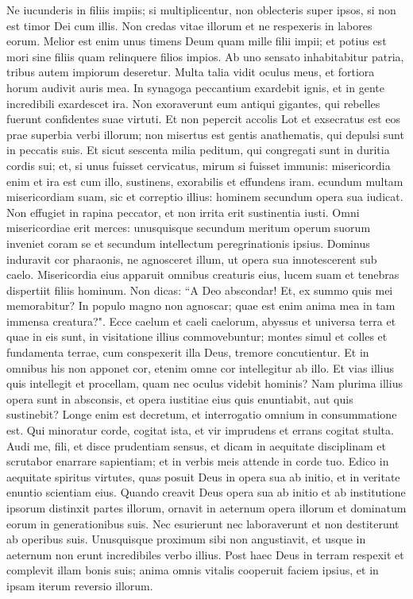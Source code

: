 \begin{biblechapter}  
\verse Ne iucunderis in filiis impiis; si multiplicentur, non oblecteris super ipsos, si non est timor Dei cum illis. 
\verse Non credas vitae illorum et ne respexeris in labores eorum. 
\verse Melior est enim unus timens Deum quam mille filii impii; 
\verse et potius est mori sine filiis quam relinquere filios impios. 
\verse Ab uno sensato inhabitabitur patria, tribus autem impiorum deseretur. 
\verse Multa talia vidit oculus meus, et fortiora horum audivit auris mea. 
\verse In synagoga peccantium exardebit ignis, et in gente incredibili exardescet ira. 
\verse Non exoraverunt eum antiqui gigantes, qui rebelles fuerunt confidentes suae virtuti. 
\verse Et non pepercit accolis Lot et exsecratus est eos prae superbia verbi illorum; 
\verse non misertus est gentis anathematis, qui depulsi sunt in peccatis suis. 
\verse Et sicut sescenta milia peditum, qui congregati sunt in duritia cordis sui; et, si unus fuisset cervicatus, mirum si fuisset immunis: 
\verse misericordia enim et ira est cum illo, sustinens, exorabilis et effundens iram. 
\verse ecundum multam misericordiam suam, sic et correptio illius: hominem secundum opera sua iudicat. 
\verse Non effugiet in rapina peccator, et non irrita erit sustinentia iusti. 
\verse Omni misericordiae erit merces: unusquisque secundum meritum operum suorum inveniet coram se et secundum intellectum peregrinationis ipsius. Dominus induravit cor pharaonis, ne agnosceret illum, ut opera sua innotescerent sub caelo. Misericordia eius apparuit omnibus creaturis eius, lucem suam et tenebras dispertiit filiis hominum. 
\verse Non dicas: “A Deo abscondar! Et, ex summo quis mei memorabitur? 
\verse In populo magno non agnoscar; quae est enim anima mea in tam immensa creatura?". 
\verse Ecce caelum et caeli caelorum, abyssus et universa terra et quae in eis sunt, in visitatione illius commovebuntur; 
\verse montes simul et colles et fundamenta terrae, cum conspexerit illa Deus, tremore concutientur. 
\verse Et in omnibus his non apponet cor, etenim omne cor intellegitur ab illo. 
\verse Et vias illius quis intellegit et procellam, quam nec oculus videbit hominis? 
\verse Nam plurima illius opera sunt in absconsis, et opera iustitiae eius quis enuntiabit, aut quis sustinebit? Longe enim est decretum, et interrogatio omnium in consummatione est. 
\verse Qui minoratur corde, cogitat ista, et vir imprudens et errans cogitat stulta. 
\verse Audi me, fili, et disce prudentiam sensus, 
\verse et dicam in aequitate disciplinam et scrutabor enarrare sapientiam; et in verbis meis attende in corde tuo. Edico in aequitate spiritus virtutes, quas posuit Deus in opera sua ab initio, et in veritate enuntio scientiam eius. 
\verse Quando creavit Deus opera sua ab initio et ab institutione ipsorum distinxit partes illorum, 
\verse ornavit in aeternum opera illorum et dominatum eorum in generationibus suis. Nec esurierunt nec laboraverunt et non destiterunt ab operibus suis. 
\verse Unusquisque proximum sibi non angustiavit, 
\verse et usque in aeternum non erunt incredibiles verbo illius. 
\verse Post haec Deus in terram respexit et complevit illam bonis suis; 
\verse anima omnis vitalis cooperuit faciem ipsius, et in ipsam iterum reversio illorum. 
\end{biblechapter}

